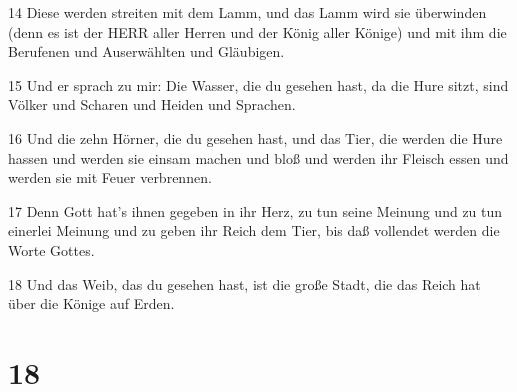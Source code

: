 \par 14 Diese werden streiten mit dem Lamm, und das Lamm wird sie überwinden (denn es ist der HERR aller Herren und der König aller Könige) und mit ihm die Berufenen und Auserwählten und Gläubigen.
\par 15 Und er sprach zu mir: Die Wasser, die du gesehen hast, da die Hure sitzt, sind Völker und Scharen und Heiden und Sprachen.
\par 16 Und die zehn Hörner, die du gesehen hast, und das Tier, die werden die Hure hassen und werden sie einsam machen und bloß und werden ihr Fleisch essen und werden sie mit Feuer verbrennen.
\par 17 Denn Gott hat's ihnen gegeben in ihr Herz, zu tun seine Meinung und zu tun einerlei Meinung und zu geben ihr Reich dem Tier, bis daß vollendet werden die Worte Gottes.
\par 18 Und das Weib, das du gesehen hast, ist die große Stadt, die das Reich hat über die Könige auf Erden.

\chapter{18}

